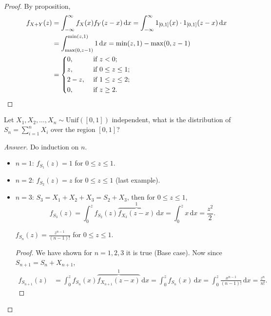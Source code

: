 \begin{proof}
    By proposition,
    \begin{align*}
        f_{X + Y}(z) &= \int _{-\infty }^{\infty} f_X(x) f_Y(z - x) \, \mathrm{d} x = \int _{-\infty }^{\infty} 1_{[0, 1]}(x) \cdot 1_{[0, 1]}(z - x) \, \mathrm{d} x \\
        &= \int _{\max (0, z-1)}^{\min (z, 1)} 1 \, \mathrm{d} x = \min (z, 1) - \max (0, z - 1) \\
        &= \begin{dcases}
            0, &\text{ if } z < 0 ;\\
            z, &\text{ if } 0 \le z \le 1 ;\\
            2 - z, &\text{ if } 1 \le z \le 2 ;\\
            0, &\text{ if } z \ge 2 .
        \end{dcases} 
    \end{align*}
\end{proof}

\begin{question}
    Let \(X_1, X_2, \dots , X_n \sim \mathrm{Unif}([0, 1]) \) independent, what is the distribution of \(S_n = \sum_{i=1}^n X_i \) over the region \([0, 1]\)?    
\end{question}

\begin{proof}[Answer]
    Do induction on \(n\). 
    \begin{itemize}
        \item \(n = 1\): \(f_{S_1}(z) = 1\) for \(0 \le z \le 1\). 
        \item \(n = 2\): \(f_{S_2}(z) = z\) for \(0 \le z \le 1\) (last example).
        \item \(n = 3\): \(S_3 = X_1 + X_2 + X_3 = S_2 + X_3\), then for \(0 \le z \le 1\),
        \[
            f_{S_3}(z) = \int _0^z f_{S_2}(z) \overbrace{f_{X_3}(z - x)}^1 \, \mathrm{d} x = \int _0^z x \, \mathrm{d} x = \frac{z^2}{2}.  
        \]
        \begin{claim}
            \(f_{S_n}(z) = \frac{z^{n-1}}{(n-1)!}\) for \(0 \le z \le 1\).  
        \end{claim}
        \begin{proof}
            We have shown for \(n = 1, 2, 3\) it is true (Base case). Now since \(S_{n+1} = S_n + X_{n+1}\),
            \begin{align*}
                f_{S_{n+1}}(z) &= \int _0^z f_{S_n}(x) \overbrace{f_{X_{n+1}}(z - x)}^1 \, \mathrm{d} x = \int _0^z f_{S_n}(x) \, \mathrm{d} x = \int _0^z \frac{x^{n-1}}{(n-1)!} \, \mathrm{d} x = \frac{z^n}{n!}.   
            \end{align*}  
        \end{proof}
    \end{itemize} 

\end{proof}

